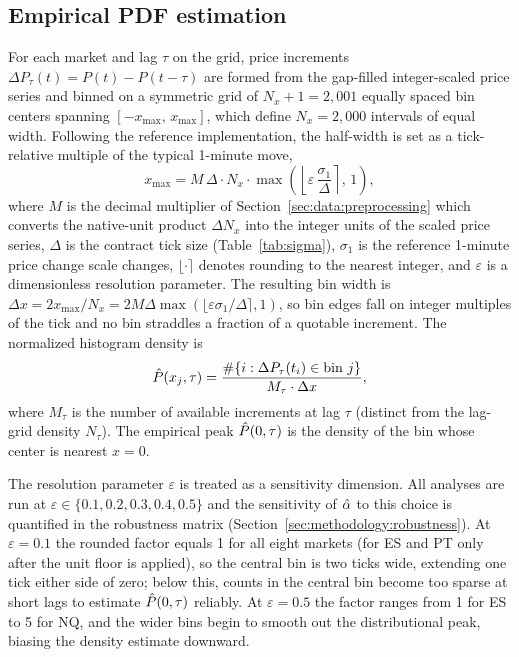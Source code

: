 \documentclass[conference]{IEEEtran}
\begin{document}
\subsection{Empirical PDF estimation}
\label{sec:methodology:pdf}

For each market and lag $\tau$ on the grid, price increments
$\Delta P_\tau(t) = P(t) - P(t-\tau)$ are formed from the gap-filled
integer-scaled price series and binned on a symmetric grid of $N_x+1 = 2{,}001$
equally spaced bin centers spanning $[-x_{\max},\,x_{\max}]$, which define
$N_x = 2{,}000$ intervals of equal width. Following the reference
implementation, the half-width is set as a tick-relative multiple of the
typical 1-minute move,
\begin{equation}
  x_{\max} = M\,\Delta\cdot N_x\cdot
             \max\!\left(\left\lfloor\varepsilon\,\frac{\sigma_1}{\Delta}\right\rceil,\,1\right),
  \label{eq:xmax}
\end{equation}
where $M$ is the decimal multiplier of Section~\ref{sec:data:preprocessing}
which converts the native-unit product $\Delta N_x$ into the integer units of
the scaled price series, $\Delta$ is the contract tick size
(Table~\ref{tab:sigma}), $\sigma_1$ is the reference 1-minute price change
scale changes, $\lfloor\cdot\rceil$
denotes rounding to the nearest integer, and $\varepsilon$ is a dimensionless
resolution parameter. The resulting bin width is
$\Delta x = 2x_{\max}/N_x = 2M\Delta\max(\lfloor\varepsilon\sigma_1/\Delta\rceil,1)$,
so bin edges fall on integer multiples of the tick and no bin straddles a
fraction of a quotable increment.
The normalized histogram density is
\begin{equation}
  \hat{P}(x_j,\tau)
  = \frac{\#\{i: \Delta P_\tau(t_i)\in\text{bin }j\}}{M_\tau\cdot\Delta x},
  \label{eq:pdf_hat}
\end{equation}
where $M_\tau$ is the number of available increments at lag $\tau$ (distinct
from the lag-grid density $N_\tau$). The empirical peak $\hat{P}(0,\tau)$ is the
density of the bin whose center is nearest $x = 0$.

The resolution parameter $\varepsilon$ is treated as a sensitivity dimension.
All analyses are run at $\varepsilon\in\{0.1,0.2,0.3,0.4,0.5\}$ and the
sensitivity of $\hat{\alpha}$ to this choice is quantified in the robustness matrix
(Section~\ref{sec:methodology:robustness}).
At $\varepsilon=0.1$ the rounded factor equals 1 for all eight markets
(for ES and PT only after the unit floor is applied), so the central bin is
two ticks wide, extending one tick either side of zero; below this, counts in the central bin become too sparse
at short lags to estimate $\hat{P}(0,\tau)$ reliably. At $\varepsilon=0.5$ the
factor ranges from 1 for ES to 5 for NQ, and the wider bins begin to smooth
out the distributional peak, biasing the density estimate downward.
\end{document}
